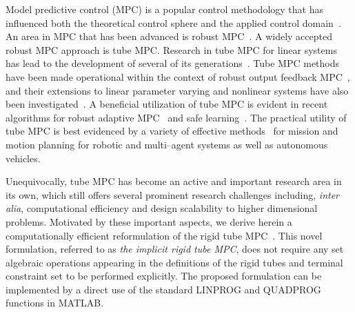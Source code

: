 \documentclass[twocolumn]{autart}
\numberwithin{equation}{section}
\begin{document}
Model predictive control (MPC) is a popular control methodology that has influenced both the theoretical control sphere and the applied control domain~\cite{mayne:rawlings:rao:scokaert:2000,rawlings:mayne:2009,rakovic:2012,mayne:2014,rakovic:2015,rakovic:2019,rakovic:levine:2019}. An area in MPC that has been advanced is robust MPC~\cite{scokaert:mayne:1998,chisci:rossiter:zappa:2001,lofberg:2003,langson:chryssochoos:mayne:rakovic:2004,mayne:seron:rakovic:2005,rakovic:2005,calafiore:campi:2006,goulart:kerrigan:maciejowski:2006,rakovic:kouvaritakis:findeisen:cannon:2011,rakovic:kouvaritakis:cannon:2012,rakovic:kouvaritakis:cannon:panos:findeisen:2012,calafiore:fagaino:2013,rakovic:levine:acikmese:2016,zanon:gros:2021}. A widely accepted robust MPC approach is tube MPC.
Research in tube MPC for linear systems has lead to the development of several of its generations~\cite{langson:chryssochoos:mayne:rakovic:2004,mayne:seron:rakovic:2005,rakovic:2005,rakovic:kouvaritakis:findeisen:cannon:2011,rakovic:kouvaritakis:cannon:2012,rakovic:kouvaritakis:cannon:panos:findeisen:2012,rakovic:levine:acikmese:2016}. Tube MPC methods have been made operational within the context of robust output feedback MPC~\cite{mayne:rakovic:findeisen:allgower:2006,mayne:rakovic:findeisen:allgower:2009}, and their extensions to linear parameter varying and nonlinear systems have also been investigated~\cite{falugi:mayne:2011,mayne:kerrigan:van:falugi:2011,kohler:soloperto:muller:allower:2020,yan:duan:2020,rakovic:dai:xia:2023,ping:yao:ding:li:2021,heydari:farrokhi:2021,hanema:lazar:toth:2020,abbas:mannel:nehoffmann:rostalski:2019}. A beneficial utilization of tube MPC is evident in recent algorithms for robust adaptive MPC~\cite{lorenzen:cannon:allgower:2019,kohler:kotting:soloperto:allgower:muller:2020,zhang:shi:2020} and safe learning~\cite{mckinnon:schoellig:2019,wabersich:zeilinger:2021,gros:zanon:2021}. The practical utility of tube MPC is best evidenced by a variety of effective methods~\cite{farrokhsiar:pavlik:najjaran:2013,prado:torres:cheein:2021,nikou:dimarogonas:2019,oshnoei:kheradmandi:muyeen:hatziargyriou:2021,khaitan:lin:dolan:2021} for mission and motion planning for robotic and multi--agent systems as well as autonomous vehicles. 

Unequivocally, tube MPC has become an active and important research area in its own, which still offers several prominent research challenges including, \emph{inter alia}, computational efficiency and design scalability to higher dimensional problems.  Motivated by these important aspects, we derive herein a computationally efficient reformulation of the rigid tube MPC~\cite{mayne:seron:rakovic:2005}. This novel formulation, referred to as \emph{the implicit rigid tube MPC}, does not require any set algebraic operations appearing in the definitions of the rigid tubes and terminal constraint set to be performed explicitly. The proposed formulation can be implemented by a direct use of the standard LINPROG and QUADPROG functions in MATLAB. 
\end{document}
